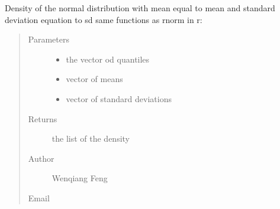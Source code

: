 \documentclass[letterpaper,12pt,english]{sphinxmanual}
\begin{document}
\begin{fulllineitems}
Density of the normal distribution with mean
equal to mean and standard deviation equation to sd
same functions as rnorm in r: 
\begin{quote}\begin{description}
\item[{Parameters}] \leavevmode\begin{itemize}
\item {} 
 \textendash{} the vector od quantiles

\item {} 
 \textendash{} vector of means

\item {} 
 \textendash{} vector of standard deviations

\end{itemize}

\item[{Returns}] \leavevmode
the list of the density

\item[{Author}] \leavevmode
Wenqiang Feng

\item[{Email}] \leavevmode
{}

\end{description}\end{quote}

\end{fulllineitems}



\subsection{}
\label{\detokenize{api:runif}}
\end{document}
